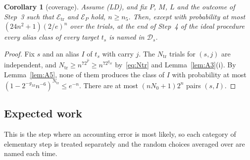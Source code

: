 \documentclass[11pt]{article}
\newtheorem{corollary}[lemma]{Corollary}
\theoremstyle{definition}
\newcommand{\cE}{\mathcal E}
\newcommand{\cD}{\mathcal D}
\newcommand{\Ntr}{N_{\mathrm{tr}}}
\begin{document}
\begin{corollary}[coverage]\label{cor:A6}
Assume \textup{(LD)}, and fix $P$, $M$, $L$ and the outcome of Step~3 such that $\cE_{\mathrm{tr}}$ and $\cE_P$ hold,
$n\ge n_5$. Then, except with probability at most $(24n^2+1)(2/e)^n$ over the trials, at the end of Step~4 of the
ideal procedure every alias class of every target $t_s$ is named in $\cD_s$.
\end{corollary}
\begin{proof}
Fix $s$ and an alias $I$ of $t_s$ with carry $j$. The $\Ntr$ trials for $(s,j)$ are independent, and
$\Ntr\ge n^72^{\hat F}\ge n^72^{g_M}$ by~\eqref{eq:Ntr} and Lemma~\ref{lem:A3}(i). By Lemma~\ref{lem:A5}, none of them
produces the class of $I$ with probability at most $(1-2^{-g_M}n^{-6})^{\Ntr}\le e^{-n}$. There are at most
$(nN_0+1)2^n$ pairs $(s,I)$.
\end{proof}

\subsection{Expected work}\label{sec:work}
This is the step where an accounting error is most likely, so each category of elementary step is treated
separately and the random choices averaged over are named each time.
\end{document}

